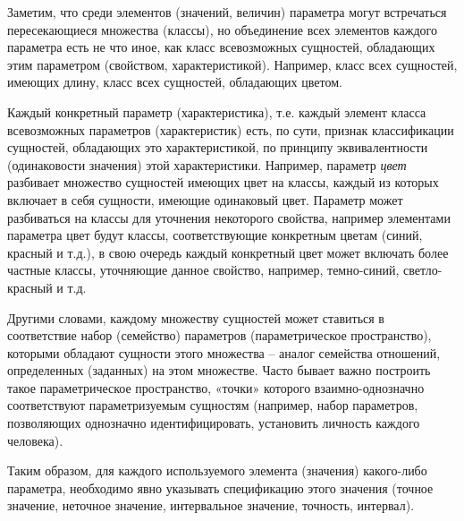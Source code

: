 \begin{SCn}
{Заметим, что среди элементов (значений, величин) параметра могут встречаться пересекающиеся множества (классы), но объединение всех элементов каждого параметра есть не что иное, как класс всевозможных сущностей, обладающих этим параметром (свойством, характеристикой). Например, класс всех сущностей, имеющих длину, класс всех сущностей, обладающих цветом.

Каждый конкретный параметр (характеристика), т.е. каждый элемент класса всевозможных параметров (характеристик) есть, по сути, признак классификации сущностей, обладающих это характеристикой, по принципу эквивалентности (одинаковости значения) этой характеристики. Например, параметр \textit{цвет} разбивает множество сущностей имеющих цвет на классы, каждый из которых включает в себя сущности, имеющие одинаковый цвет. Параметр может разбиваться на классы для уточнения некоторого свойства, например элементами параметра цвет будут классы, соответствующие конкретным цветам (синий, красный и т.д.), в свою очередь каждый конкретный цвет может включать более частные классы, уточняющие данное свойство, например, темно-синий, светло-красный и т.д.

Другими словами, каждому множеству сущностей может ставиться в соответствие набор (семейство) параметров (параметрическое пространство), которыми обладают сущности этого множества – аналог семейства отношений, определенных (заданных) на этом множестве. Часто бывает важно построить такое параметрическое пространство, «точки» которого взаимно-однозначно соответствуют параметризуемым сущностям (например, набор параметров, позволяющих однозначно идентифицировать, установить личность каждого человека). 

Таким образом, для каждого используемого элемента (значения) какого-либо параметра, необходимо явно указывать спецификацию этого значения (точное значение, неточное значение, интервальное значение, точность, интервал).}


\end{SCn}
